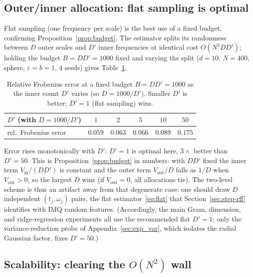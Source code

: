 \documentclass{article}
\begin{document}
\subsection{Outer/inner allocation: flat sampling is optimal}
\label{sec:exp_budget}

Flat sampling (one frequency per scale) is the best use of a fixed budget, confirming Proposition~\ref{prop:budget}. The estimator splits its randomness between $D$ outer scales and $D'$ inner frequencies at identical cost $O(N^2 DD')$; holding the budget $B=DD'=1000$ fixed and varying the split ($d=10$, $N=400$, sphere, $\varepsilon=b=1$, $4$ seeds) gives Table~\ref{tab:budget}.

\begin{table}[h]
\centering
\caption{Relative Frobenius error at a fixed budget $B=DD'=1000$ as the inner count $D'$ varies (so $D=1000/D'$). Smaller $D'$ is better; $D'=1$ (flat sampling) wins.}
\label{tab:budget}
\begin{tabular}{lccccc}
\toprule
$D'$ (with $D=1000/D'$) & $1$ & $2$ & $5$ & $10$ & $50$ \\
\midrule
rel.\ Frobenius error & $\mathbf{0.059}$ & $0.063$ & $0.066$ & $0.089$ & $0.175$ \\
\bottomrule
\end{tabular}
\end{table}

Error rises monotonically with $D'$: $D'=1$ is optimal here, $3\times$ better than $D'=50$. This is Proposition~\ref{prop:budget} in numbers: with $DD'$ fixed the inner term $V_{\mathrm{in}}/(DD')$ is constant and the outer term $V_{\mathrm{out}}/D$ falls as $1/D$ when $V_{\mathrm{out}}>0$, so the largest $D$ wins (if $V_{\mathrm{out}}=0$, all allocations tie). The two-level scheme is thus an artifact away from that degenerate case: one should draw $D$ independent $(t_j,\omega_j)$ pairs, the flat estimator~\eqref{eq:flat} that Section~\ref{sec:step-rff} identifies with IMQ random features. (Accordingly, the main Gram, dimension, and ridge-regression experiments all use the recommended flat $D'=1$; only the variance-reduction probe of Appendix~\ref{sec:exp_var}, which isolates the radial Gaussian factor, fixes $D'=50$.)

\subsection{Scalability: clearing the \texorpdfstring{$O(N^2)$}{O(N\^{}2)} wall}
\label{sec:exp_scaling}
\end{document}
